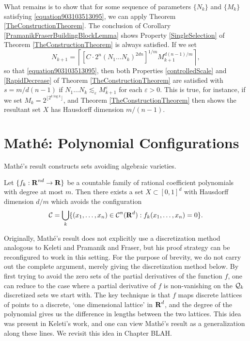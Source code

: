 What remains is to show that for some sequence of parameters $\{ N_k \}$ and $\{ M_k \}$ satisfying \eqref{equation903103513095}, we can apply Theorem \ref{TheConstructionTheorem}. The conclusion of Corollary \ref{PramanikFraserBuildingBlockLemma} shows Property \ref{SingleSelection} of Theorem \ref{TheConstructionTheorem} is always satisfied. If we set
%
\[ N_{k+1} = \left\lceil \left[ C \cdot 2^n (N_1 \dots N_k)^{2dn} \right]^{1/m} M_{k+1}^{d(n-1)/m} \right\rceil, \]
%
so that \eqref{equation903103513095}, then both Properties \ref{controlledScale} and \ref{RapidDecrease} of Theorem \ref{TheConstructionTheorem} are satisfied with $s = m/d(n-1)$ if $N_1 \dots N_k \lesssim_\varepsilon M_{k+1}^\varepsilon$ for each $\varepsilon > 0$. This is true, for instance, if we set $M_k = 2^{\lfloor 2^{k \log k} \rfloor}$, and Theorem \ref{TheConstructionTheorem} then shows the resultant set $X$ has Hausdorff dimension $m/(n-1)$.

\section{Math\'{e}: Polynomial Configurations}

Math\'{e}'s result constructs sets avoiding algebraic varieties.

\begin{theorem}[Math\'{e}]
    Let $\{ f_k: \operatorname{\mathbf{R}}^{nd} \to \mathbf{R} \}$ be a countable family of rational coefficient polynomials with degree at most $m$. Then there exists a set $X \subset [0,1]^d$ with Hausdorff dimension $d/m$ which avoids the configuration
    \[ \operatorname{\mathcal{C}} = \bigcup_k \{ (x_1, \dots, x_n) \in \operatorname{\mathcal{C}}^n(\operatorname{\mathbf{R}}^d) : f_k(x_1, \dots, x_n) = 0 \}. \]
\end{theorem}

Originally, Math\'{e}'s result does not explicitly use a discretization method analogous to Keleti and Pramanik and Fraser, but his proof strategy can be reconfigured to work in this setting. For the purpose of brevity, we do not carry out the complete argument, merely giving the discretization method below. By first trying to avoid the zero sets of the partial derivatives of the function $f$, one can reduce to the case where a partial derivative of $f$ is non-vanishing on the $\operatorname{\mathcal{Q}}_k$ discretized sets we start with. The key technique is that $f$ maps discrete lattices of points to a discrete, `one dimensional lattice' in $\operatorname{\mathbf{R}}^d$, and the degree of the polynomial gives us the difference in lengths between the two lattices. This idea was present in Keleti's work, and one can view Math\'{e}'s result as a generalization along these lines. We revisit this idea in Chapter BLAH.

